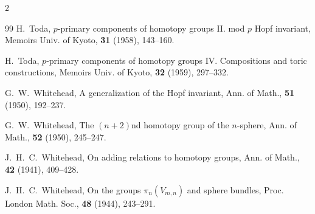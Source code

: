 \documentclass[10pt, leqno]{ltjsarticle}
\numberwithin{equation}{section}
\theoremstyle{plain}
\theoremstyle{definition}
\theoremstyle{remark}
\begin{document}
\begin{paracol}{2}
\begin{thebibliography}{99}
H.~Toda,
\newblock $p$-primary components of homotopy groups II. mod $p$ Hopf invariant,
\newblock Memoirs Univ. of Kyoto, {\bf 31} (1958), 143--160.

H.~Toda,
\newblock $p$-primary components of homotopy groups IV. Compositions and toric constructions,
\newblock Memoirs Univ. of Kyoto, {\bf 32} (1959), 297--332.

G.~W.~Whitehead,
\newblock A generalization of the Hopf invariant,
\newblock Ann. of Math., {\bf 51} (1950), 192--237.

G.~W.~Whitehead,
\newblock The $(n+2)$nd homotopy group of the $n$-sphere,
\newblock Ann. of Math., {\bf 52} (1950), 245--247.

J.~H.~C.~Whitehead,
\newblock On adding relations to homotopy groups,
\newblock Ann. of Math., {\bf 42} (1941), 409--428.

J.~H.~C.~Whitehead,
\newblock On the groups $\pi_n(V_{m,n})$ and sphere bundles,
\newblock Proc. London Math. Soc., {\bf 48} (1944), 243--291.

\end{thebibliography}

\end{paracol}
\end{document}
